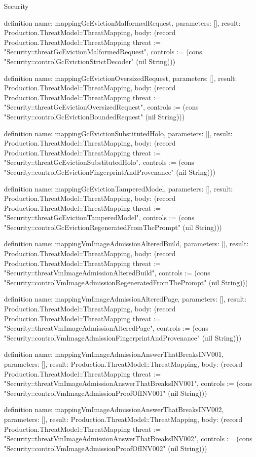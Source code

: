 \begin{lexlean}{Security}
\begin{semanticmodule}
definition{
  name: mappingGcEvictionMalformedRequest,
  parameters: [],
  result: Production.ThreatModel::ThreatMapping,
  body: (record Production.ThreatModel::ThreatMapping {threat := "Security::threatGcEvictionMalformedRequest", controls := (cons "Security::controlGcEvictionStrictDecoder" (nil String))})
}

definition{
  name: mappingGcEvictionOversizedRequest,
  parameters: [],
  result: Production.ThreatModel::ThreatMapping,
  body: (record Production.ThreatModel::ThreatMapping {threat := "Security::threatGcEvictionOversizedRequest", controls := (cons "Security::controlGcEvictionBoundedRequest" (nil String))})
}

definition{
  name: mappingGcEvictionSubstitutedHolo,
  parameters: [],
  result: Production.ThreatModel::ThreatMapping,
  body: (record Production.ThreatModel::ThreatMapping {threat := "Security::threatGcEvictionSubstitutedHolo", controls := (cons "Security::controlGcEvictionFingerprintAndProvenance" (nil String))})
}

definition{
  name: mappingGcEvictionTamperedModel,
  parameters: [],
  result: Production.ThreatModel::ThreatMapping,
  body: (record Production.ThreatModel::ThreatMapping {threat := "Security::threatGcEvictionTamperedModel", controls := (cons "Security::controlGcEvictionRegeneratedFromThePrompt" (nil String))})
}

definition{
  name: mappingVmImageAdmissionAlteredBuild,
  parameters: [],
  result: Production.ThreatModel::ThreatMapping,
  body: (record Production.ThreatModel::ThreatMapping {threat := "Security::threatVmImageAdmissionAlteredBuild", controls := (cons "Security::controlVmImageAdmissionRegeneratedFromThePrompt" (nil String))})
}

definition{
  name: mappingVmImageAdmissionAlteredPage,
  parameters: [],
  result: Production.ThreatModel::ThreatMapping,
  body: (record Production.ThreatModel::ThreatMapping {threat := "Security::threatVmImageAdmissionAlteredPage", controls := (cons "Security::controlVmImageAdmissionFingerprintAndProvenance" (nil String))})
}

definition{
  name: mappingVmImageAdmissionAnswerThatBreaksINV001,
  parameters: [],
  result: Production.ThreatModel::ThreatMapping,
  body: (record Production.ThreatModel::ThreatMapping {threat := "Security::threatVmImageAdmissionAnswerThatBreaksINV001", controls := (cons "Security::controlVmImageAdmissionProofOfINV001" (nil String))})
}

definition{
  name: mappingVmImageAdmissionAnswerThatBreaksINV002,
  parameters: [],
  result: Production.ThreatModel::ThreatMapping,
  body: (record Production.ThreatModel::ThreatMapping {threat := "Security::threatVmImageAdmissionAnswerThatBreaksINV002", controls := (cons "Security::controlVmImageAdmissionProofOfINV002" (nil String))})
}


\end{semanticmodule}
\end{lexlean}
